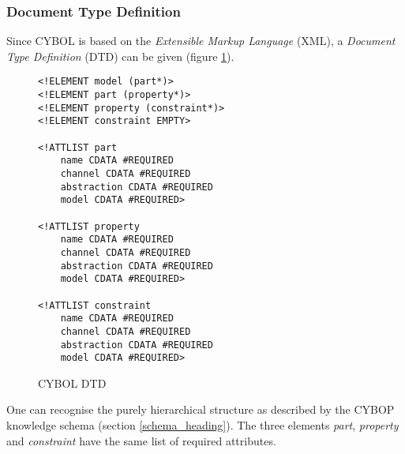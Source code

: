 %
%
%
%
%
%
%

\subsubsection{Document Type Definition}
\label{document_type_definition_heading}

Since CYBOL is based on the \emph{Extensible Markup Language} (XML), a
\emph{Document Type Definition} (DTD) can be given (figure \ref{dtd_figure}).

\begin{figure}[ht]
    \bigskip
    \begin{scriptsize}
        \begin{verbatim}
<!ELEMENT model (part*)>
<!ELEMENT part (property*)>
<!ELEMENT property (constraint*)>
<!ELEMENT constraint EMPTY>

<!ATTLIST part
    name CDATA #REQUIRED
    channel CDATA #REQUIRED
    abstraction CDATA #REQUIRED
    model CDATA #REQUIRED>

<!ATTLIST property
    name CDATA #REQUIRED
    channel CDATA #REQUIRED
    abstraction CDATA #REQUIRED
    model CDATA #REQUIRED>

<!ATTLIST constraint
    name CDATA #REQUIRED
    channel CDATA #REQUIRED
    abstraction CDATA #REQUIRED
    model CDATA #REQUIRED>
        \end{verbatim}
        \caption{CYBOL DTD}
        \label{dtd_figure}
    \end{scriptsize}
\end{figure}

One can recognise the purely hierarchical structure as described by the CYBOP
knowledge schema (section \ref{schema_heading}). The three elements
\emph{part}, \emph{property} and \emph{constraint} have the same list of
required attributes.
